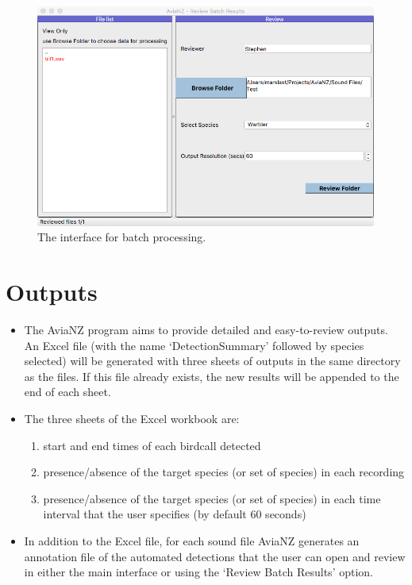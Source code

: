 \documentclass{article}
\begin{document}
\begin{figure}[h!]
\centering
\includegraphics[width=.5\textwidth]{Figs/review2}
\caption{The interface for batch processing.}
\label{batch}
\end{figure}


\section{Outputs}
\label{sec:outputs}

\begin{itemize}
\item The AviaNZ program aims to provide detailed and easy-to-review outputs. An Excel file (with the name `DetectionSummary' followed by species selected) will be generated with three sheets of outputs in the same directory as the files. If this file already exists, the new results will be appended to the end of each sheet. 

\item The three sheets of the Excel workbook are:

\begin{enumerate}
\item start and end times of each birdcall detected
\item presence/absence of the target species (or set of species) in each recording
\item  presence/absence of the target species (or set of species) in each time interval that the user specifies (by default 60 seconds)
\end{enumerate}

\item In addition to the Excel file, for each sound file AviaNZ generates an annotation file of the automated detections that  the user can open and review in either the main interface or using the `Review Batch Results' option. 
\end{itemize}
\end{document}
